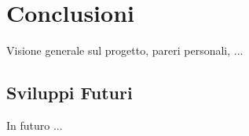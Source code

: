 

\chapter{Conclusioni}\label{conclusioni}
Visione generale sul progetto, pareri personali, ... 
    \section{Sviluppi Futuri}
    In futuro ...
